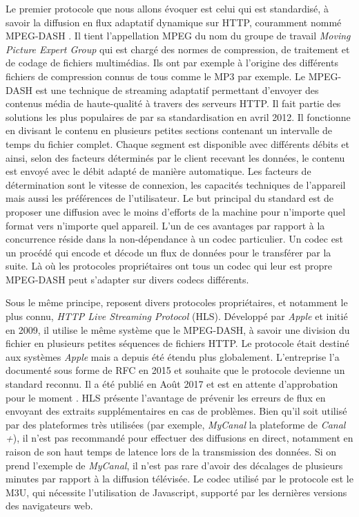 \documentclass{polytech/polytech}
\begin{document}
Le premier protocole que nous allons évoquer est celui qui est standardisé, à savoir la diffusion en flux adaptatif dynamique sur HTTP, couramment nommé MPEG-DASH \cite{_mpegdash_2017}. Il tient l’appellation MPEG du nom du groupe de travail \textit{Moving Picture Expert Group} qui est chargé des normes de compression, de traitement et de codage de fichiers multimédias. Ils ont par exemple à l’origine des différents fichiers de compression connus de tous comme le MP3 par exemple. Le MPEG-DASH est une technique de streaming adaptatif permettant d’envoyer des contenus média de haute-qualité à travers des serveurs HTTP. Il fait partie des solutions les plus populaires de par sa standardisation en avril 2012. Il fonctionne en divisant le contenu en plusieurs petites sections contenant un intervalle de temps du fichier complet. Chaque segment est disponible avec différents débits et ainsi, selon des facteurs déterminés par le client recevant les données, le contenu est envoyé avec le débit adapté de manière automatique. Les facteurs de détermination sont le vitesse de connexion, les capacités techniques de l’appareil mais aussi les préférences de l’utilisateur. Le but principal du standard est de proposer une diffusion avec le moins d’efforts de la machine pour n’importe quel format vers n’importe quel appareil. L’un de ces avantages par rapport à la concurrence réside dans la non-dépendance à un codec particulier. Un codec est un procédé qui encode et décode un flux de données pour le transférer par la suite. Là où les protocoles propriétaires ont tous un codec qui leur est propre MPEG-DASH peut s’adapter sur divers codecs différents.

Sous le même principe, reposent divers protocoles propriétaires, et notamment le plus connu, \textit{HTTP Live Streaming Protocol} (HLS). Développé par \textit{Apple} et initié en 2009, il utilise le même système que le MPEG-DASH, à savoir une division du fichier en plusieurs petites séquences de fichiers HTTP. Le protocole était destiné aux systèmes \textit{Apple} mais a depuis été étendu plus globalement. L’entreprise l’a documenté sous forme de RFC en 2015 et souhaite que le protocole devienne un standard reconnu. Il a été publié en Août 2017 et est en attente d’approbation pour le moment \cite{pantos_http_2017}. HLS présente l’avantage de prévenir les erreurs de flux en envoyant des extraits supplémentaires en cas de problèmes. Bien qu’il soit utilisé par des plateformes très utilisées (par exemple, \textit{MyCanal} la plateforme de \textit{Canal +}), il n’est pas recommandé pour effectuer des diffusions en direct, notamment en raison de son haut temps de latence lors de la transmission des données. Si on prend l’exemple de \textit{MyCanal}, il n’est pas rare d’avoir des décalages de plusieurs minutes par rapport à la diffusion télévisée. Le codec utilisé par le protocole est le M3U, qui nécessite l’utilisation de Javascript, supporté par les dernières versions des navigateurs web.
\end{document}
